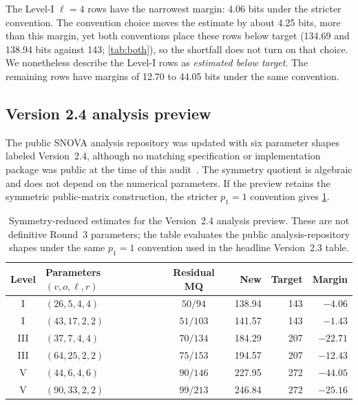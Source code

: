 \documentclass[runningheads]{llncs}
\newcommand{\SNOVA}{\textsf{SNOVA}}
\begin{document}
The Level-I $\ell=4$ rows have the narrowest margin: 4.06 bits under the stricter convention.  The convention choice moves the estimate by about 4.25 bits, more than this margin, yet both conventions place these rows below target (134.69 and 138.94 bits against 143; \cref{tab:both}), so the shortfall does not turn on that choice.  We nonetheless describe the Level-I rows as \emph{estimated below target}.  The remaining rows have margins of 12.70 to 44.05 bits under the same convention.

\subsection{Version 2.4 analysis preview}\label{sec:snova24}

The public \SNOVA{} analysis repository was updated with six parameter shapes labeled Version~2.4, although no matching specification or implementation package was public at the time of this audit~\cite{SNOVA24Preview}.  The symmetry quotient is algebraic and does not depend on the numerical parameters.  If the preview retains the symmetric public-matrix construction, the stricter $p_1=1$ convention gives \cref{tab:snova24}.

\begin{table}[t]
\centering
\caption{Symmetry-reduced estimates for the Version~2.4 analysis preview.  These are not definitive Round~3 parameters; the table evaluates the public analysis-repository shapes under the same $p_1=1$ convention used in the headline Version~2.3 table.}\label{tab:snova24}
\small
\setlength{\tabcolsep}{5pt}
\begin{tabular}{@{}c l c r r r@{}}
\toprule
Level & Parameters $(v,o,\ell,r)$ & Residual MQ & New & Target & Margin\\
\midrule
I   & $(26,5,4,4)$   & $50/94$  & 138.94 & 143 & $-4.06$\\
I   & $(43,17,2,2)$  & $51/103$ & 141.57 & 143 & $-1.43$\\
III & $(37,7,4,4)$   & $70/134$ & 184.29 & 207 & $-22.71$\\
III & $(64,25,2,2)$  & $75/153$ & 194.57 & 207 & $-12.43$\\
V   & $(44,6,4,6)$   & $90/146$ & 227.95 & 272 & $-44.05$\\
V   & $(90,33,2,2)$  & $99/213$ & 246.84 & 272 & $-25.16$\\
\bottomrule
\end{tabular}
\end{table}
\end{document}
